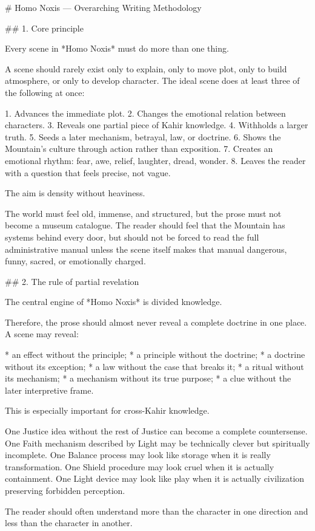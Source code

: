 # Homo Noxis — Overarching Writing Methodology

## 1. Core principle

Every scene in *Homo Noxis* must do more than one thing.

A scene should rarely exist only to explain, only to move plot, only to build atmosphere, or only to develop character. The ideal scene does at least three of the following at once:

1. Advances the immediate plot.
2. Changes the emotional relation between characters.
3. Reveals one partial piece of Kahir knowledge.
4. Withholds a larger truth.
5. Seeds a later mechanism, betrayal, law, or doctrine.
6. Shows the Mountain’s culture through action rather than exposition.
7. Creates an emotional rhythm: fear, awe, relief, laughter, dread, wonder.
8. Leaves the reader with a question that feels precise, not vague.

The aim is density without heaviness.

The world must feel old, immense, and structured, but the prose must not become a museum catalogue. The reader should feel that the Mountain has systems behind every door, but should not be forced to read the full administrative manual unless the scene itself makes that manual dangerous, funny, sacred, or emotionally charged.

## 2. The rule of partial revelation

The central engine of *Homo Noxis* is divided knowledge.

Therefore, the prose should almost never reveal a complete doctrine in one place. A scene may reveal:

* an effect without the principle;
* a principle without the doctrine;
* a doctrine without its exception;
* a law without the case that breaks it;
* a ritual without its mechanism;
* a mechanism without its true purpose;
* a clue without the later interpretive frame.

This is especially important for cross-Kahir knowledge.

One Justice idea without the rest of Justice can become a complete countersense. One Faith mechanism described by Light may be technically clever but spiritually incomplete. One Balance process may look like storage when it is really transformation. One Shield procedure may look cruel when it is actually containment. One Light device may look like play when it is actually civilization preserving forbidden perception.

The reader should often understand more than the character in one direction and less than the character in another.

